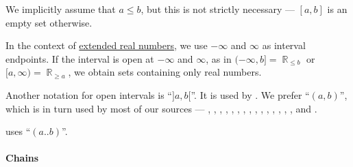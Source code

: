 \begin{comments}
  \item We implicitly assume that \( a \leq b \), but this is not strictly necessary --- \( [a, b] \) is an empty set otherwise.

  \item In the context of \hyperref[def:extended_real_numbers]{extended real numbers}, we use \( -\infty \) and \( \infty \) as interval endpoints. If the interval is open at \( -\infty \) and \( \infty \), as in \( (-\infty, b] = \BbbR_{\leq b} \) or \( [a, \infty) = \BbbR_{\geq a} \), we obtain sets containing only real numbers.

  \item Another notation for open intervals is \enquote{\( ]a, b[ \)}. It is used by . We prefer \enquote{\( (a, b) \)}, which is in turn used by most of our sources --- , , , , , , , , , , , , ,  , ,  and .

   uses \enquote{\( (a..b) \)}.
\end{comments}

\paragraph{Chains}

